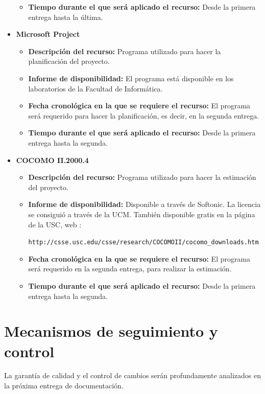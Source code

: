 \documentclass[spanish,a4paper,12pt]{report}	%
\begin{document}
\begin{itemize}
\begin{itemize}
				  	  \item \textbf{Tiempo durante el que será aplicado el recurso: }Desde la primera entrega hasta la última. 
					\end{itemize}
				\item \textbf{Microsoft Project}
				  	\begin{itemize}
				  	  \item \textbf{Descripción del recurso: } Programa utilizado para hacer la planificación del proyecto.
				  	  \item \textbf{Informe de disponibilidad: }El programa está disponible en los laboratorios de la Facultad de Informática.
				  	  \item \textbf{Fecha cronológica en la que se requiere el recurso: }El programa será requerido para hacer la planificación, es decir, en la
				  	  					segunda entrega.
				  	  \item \textbf{Tiempo durante el que será aplicado el recurso: }Desde la primera entrega hasta la segunda. 
					\end{itemize}
				\item \textbf{COCOMO II.2000.4}
				  	\begin{itemize}
				  	  \item \textbf{Descripción del recurso: } Programa utilizado para hacer la estimación del proyecto.
				  	  \item \textbf{Informe de disponibilidad: }Disponible a través de Softonic. La licencia se consiguió a través de la UCM. También disponible gratis en la página de la USC, web :

\texttt{http://csse.usc.edu/csse/research/COCOMOII/cocomo\_downloads.htm}
				  	  \item \textbf{Fecha cronológica en la que se requiere el recurso: }El programa será requerido en la segunda entrega, para
				  	  						realizar la estimación.
				  	  \item \textbf{Tiempo durante el que será aplicado el recurso: }Desde la primera entrega hasta la segunda. 
					\end{itemize}
			\end{itemize} 

\newpage
\mbox{}
\thispagestyle{empty}						%
\newpage
\setcounter{section}{0}



\chapter{Mecanismos de seguimiento y control} La garantía de calidad y el control de cambios serán profundamente analizados en la próxima entrega de documentación.
\end{document}
